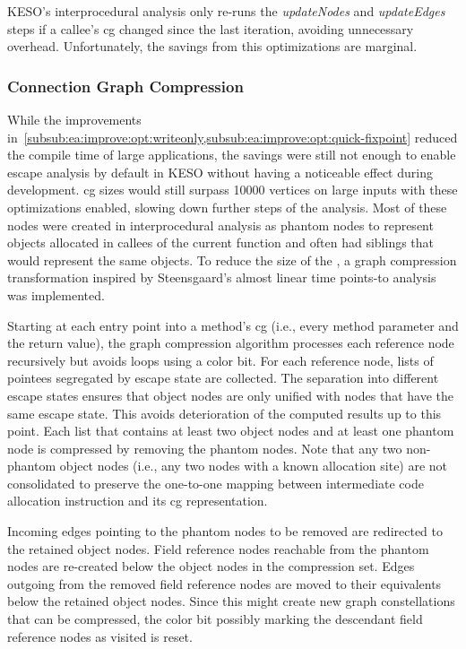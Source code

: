 				KESO's interprocedural analysis only re-runs the \nohyphens{\emph{updateNodes}} and \emph{updateEdges} steps if
				a callee's \gls{cg} changed since the last iteration, avoiding unnecessary overhead. Unfortunately, the savings
				from this optimizations are marginal.

			\subsubsection{Connection Graph Compression}
				\label{subsub:ea:improve:opt:compression}
				While the improvements in~\cref{subsub:ea:improve:opt:writeonly,subsub:ea:improve:opt:quick-fixpoint} reduced
				the compile time of large applications, the savings were still not enough to enable escape analysis by default
				in KESO without having a noticeable effect during development. \Acrlong{cg} sizes would still surpass 10000
				vertices on large inputs with these optimizations enabled, slowing down further steps of the analysis. Most of
				these nodes were created in interprocedural analysis as phantom nodes to represent objects allocated in callees
				of the current function and often had siblings that would represent the same objects. To reduce the size of the
				, a graph compression transformation inspired by Steensgaard's almost linear time points-to
				analysis~\cite{steensgaard:96:popl} was implemented.

				Starting at each entry point into a method's \gls{cg} (i.e., every method parameter and the return value), the
				graph compression algorithm processes each reference node recursively but avoids loops using a color bit. For
				each reference node, lists of pointees segregated by escape state are collected. The separation into different
				escape states ensures that object nodes are only unified with nodes that have the same escape state. This avoids
				deterioration of the computed results up to this point. Each list that contains at least two object nodes and at
				least one phantom node is compressed by removing the phantom nodes. Note that any two non-phantom object nodes
				(i.e., any two nodes with a known allocation site) are not consolidated to preserve the one-to-one mapping
				between intermediate code allocation instruction and its \gls{cg} representation.

				Incoming edges pointing to the phantom nodes to be removed are redirected to the retained object nodes. Field
				reference nodes reachable from the phantom nodes are re-created below the object nodes in the compression set.
				Edges outgoing from the removed field reference nodes are moved to their equivalents below the retained object
				nodes. Since this might create new graph constellations that can be compressed, the color bit possibly marking
				the descendant field reference nodes as visited is reset.

